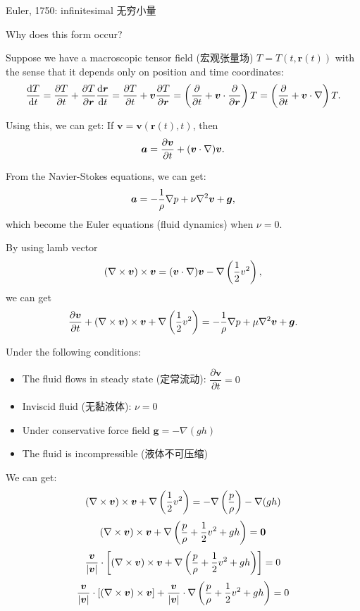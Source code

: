 Euler, 1750: infinitesimal 无穷小量

Why does this form occur?

Suppose we have a macroscopic tensor field (宏观张量场)
\(T = T(t, \boldsymbol r(t))\) with the sense that it depends only on
position and time coordinates:
\[{\mathrm dT \over \mathrm dt} = {\partial T \over \partial t} + {\partial T \over \partial \boldsymbol r} {\mathrm d \boldsymbol r \over \mathrm dt} = {\partial T \over \partial t} + \boldsymbol v {\partial T \over \partial \boldsymbol r} = \left({\partial \over \partial t} + \boldsymbol v \cdot {\partial \over \partial \boldsymbol r} \right) T = \left({\partial \over \partial t} + \boldsymbol v \cdot \nabla \right) T.\]

Using this, we can get: If
\(\boldsymbol v = \boldsymbol v(\boldsymbol r(t), t)\), then
\[\boldsymbol a = {\partial \boldsymbol v \over \partial t} + (\boldsymbol v \cdot \nabla) \boldsymbol v.\]

From the Navier-Stokes equations, we can get:
\[\boldsymbol a = - {1 \over \rho} \nabla p + \nu \nabla^2 \boldsymbol v + \boldsymbol g,\]
which become the Euler equations (fluid dynamics) when \(\nu = 0.\)

By using lamb vector
\[\left(\nabla \times \boldsymbol v \right) \times \boldsymbol v = (\boldsymbol v \cdot \nabla) \boldsymbol v - \nabla \left( {1 \over 2} v^2 \right),\]
we can get
\[{\partial \boldsymbol v \over \partial t} + \left(\nabla \times \boldsymbol v \right) \times \boldsymbol v + \nabla \left( {1 \over 2} v^2 \right) = -{1 \over \rho} \nabla p + \mu \nabla^2 \boldsymbol v + \boldsymbol g.\]

Under the following conditions:

\begin{itemize}
\tightlist{}
\item
  The fluid flows in steady state (定常流动):
  \(\dfrac{\partial \boldsymbol v}{\partial t} = 0\)
\item
  Inviscid fluid (无黏液体): \(\nu = 0\)
\item
  Under conservative force field \(\boldsymbol g = - \nabla (gh)\)
\item
  The fluid is incompressible (液体不可压缩)
\end{itemize}

We can get:
\[\left(\nabla \times \boldsymbol v \right) \times \boldsymbol v + \nabla \left( {1 \over 2} v^2 \right) = - \nabla \left({p \over \rho} \right) - \nabla (gh)\]
\[\left(\nabla \times \boldsymbol v \right) \times \boldsymbol v + \nabla \left({p \over \rho} + {1 \over 2} v^2 + gh \right) = \boldsymbol 0\]
\[{\boldsymbol v \over |\boldsymbol v|} \cdot \left[ \left(\nabla \times \boldsymbol v \right) \times \boldsymbol v + \nabla \left({p \over \rho} + {1 \over 2} v^2 + gh \right) \right] = 0\]
\[{\boldsymbol v \over |\boldsymbol v|} \cdot \left[ \left(\nabla \times \boldsymbol v \right) \times \boldsymbol v \right] + {\boldsymbol v \over |\boldsymbol v|} \cdot \nabla \left({p \over \rho} + {1 \over 2} v^2 + gh \right) = 0\]

